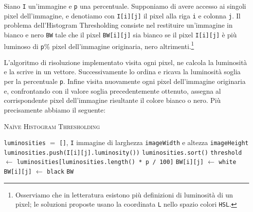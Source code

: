 \documentclass[12pt]{article}
\begin{document}
    Siano \texttt{I} un'immagine e \texttt{p} una percentuale. Supponiamo di 
    avere accesso ai singoli pixel dell'immagine, e denotiamo con 
    \texttt{I[i][j]} il pixel alla riga \texttt{i} e colonna \texttt{j}.
    Il problema dell'Histogram Thresholding consiste nel restituire
    un'immagine in bianco e nero \texttt{BW} tale che il pixel
    \texttt{BW[i][j]} sia bianco se il pixel \texttt{I[i][j]} è più luminoso
    di \texttt{p}\% pixel dell'immagine originaria, nero altrimenti.\footnote{
    Osserviamo che in letteratura esistono più definizioni di luminosità di 
    un pixel; le soluzioni proposte usano la coordinata \texttt{L} nello 
    spazio colori \texttt{HSL}.}

    L'algoritmo di risoluzione implementato visita ogni pixel, ne calcola la
    luminosit\`a e la scrive in un vettore. Successivamente lo ordina e
    ricava la luminosit\`a soglia per la percentuale \texttt{p}. Infine visita
    nuovamente ogni pixel dell'immagine originaria e, confrontando con il
    valore soglia precedentemente ottenuto, assegna al corrispondente pixel
    dell'immagine risultante il colore bianco o nero. Pi\`u precisamente
    abbiamo il seguente:

    \begin{algorithm}
        \caption{\textsc{Na\"ive Histogram Thresholding}}
        \begin{algorithmic}[1]
            \REQUIRE \texttt{luminosities} \(=\) \texttt{[]}, \texttt{I} immagine di larghezza \texttt{imageWidth} e altezza \texttt{imageHeight}
                    \STATE \texttt{luminosities.push(I[i][j].luminosity())}
                \ENDFOR
            \ENDFOR
            \STATE \texttt{luminosities.sort()}
            \STATE \texttt{threshold} \(\leftarrow\) \texttt{luminosities[luminosities.length() * p / 100]}
                        \STATE \texttt{BW[i][j]} \(\leftarrow\) \texttt{white}
                    \ELSE
                        \STATE \texttt{BW[i][j]} \(\leftarrow\) \texttt{black}
                    \ENDIF
                \ENDFOR
            \ENDFOR
            \RETURN \texttt{BW}
        \end{algorithmic}
    \end{algorithm}
\end{document}
